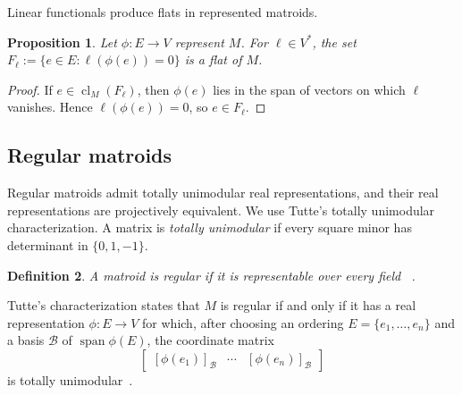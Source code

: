\documentclass[11pt]{article}
\numberwithin{equation}{section}
\newtheorem{definition}{Definition}[section]
\newtheorem{proposition}[definition]{Proposition}
\theoremstyle{remark}
\newcommand{\cl}{\operatorname{cl}}
\begin{document}
Linear functionals produce flats in represented matroids.

\begin{proposition}
\label{prop:functional-zero-flat}
Let $\phi:E\to V$ represent $M$. For $\ell\in V^*$, the set $F_\ell:=\{e\in E:\ell(\phi(e))=0\}$ is a flat of $M$.
\end{proposition}

\begin{proof}
If $e\in\cl_M(F_\ell)$, then $\phi(e)$ lies in the span of vectors on which
$\ell$ vanishes. Hence $\ell(\phi(e))=0$, so $e\in F_\ell$.
\end{proof}

\subsection{Regular matroids}
\label{subsec:regular-matroids}

Regular matroids admit totally unimodular real representations, and their
real representations are projectively equivalent. We use Tutte's totally
unimodular characterization. A matrix is \emph{totally unimodular} if every
square minor has determinant in $\{0,1,-1\}$.

\begin{definition}
\label{def:regular-matroid}
A matroid is \emph{regular} if it is representable over every field
~\cite{Oxley2011}.
\end{definition}

Tutte's characterization states that $M$ is regular if and only if it has a
real representation $\phi:E\to V$ for which, after choosing an ordering
$E=\{e_1,\ldots,e_n\}$ and a basis $\mathcal B$ of
$\operatorname{span}\phi(E)$, the coordinate matrix
\begin{equation}
    \begin{bmatrix}
        [\phi(e_1)]_{\mathcal B} & \cdots & [\phi(e_n)]_{\mathcal B}
    \end{bmatrix}
\end{equation}
is totally unimodular~\cite{Tutte1958,Oxley2011}.
\end{document}
